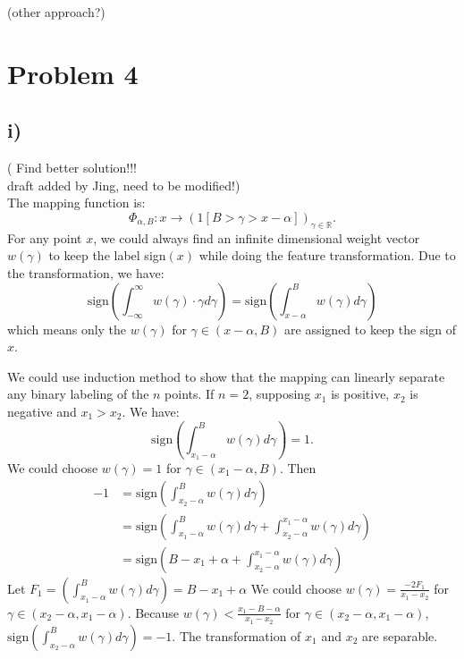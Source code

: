 \documentclass[twoside,11pt]{homework}
\begin{document}
\color{red}(other approach?) \color{black}


\section*{Problem 4}
\subsection*{i)}
\color{red} (
Find better solution!!!\\
draft added by Jing, need to be modified!) \color{black} \\
The mapping function is:
%
\begin{equation}  
\Phi_{\alpha, B}: x \rightarrow (1[B > \gamma > x-\alpha])_{\gamma \in \mathbb{R}}.
\end{equation}
%
For any point $x$, we could always find  an infinite dimensional weight vector $w(\gamma)$ to keep the label sign$(x)$ while doing the feature transformation. 
Due to the transformation, we have:
%
\begin{equation}
\mathrm{sign}(\int_{-\infty}^{\infty} w(\gamma) \cdot \gamma d\gamma ) = \mathrm{sign}(\int_{x - \alpha}^B w(\gamma) d\gamma)
\end{equation}
%
which means only the $w(\gamma) $ for $\gamma \in (x - \alpha, B)$ are assigned to keep the sign of $x$.

We could use induction method to show that the mapping can linearly separate any binary labeling of the $n$ points.
If $n=2$, supposing $x_1$  is positive,  $x_2$ is negative and $x_1 > x_2$.
We have:
%
\begin{equation}
\mathrm{sign}(\int_{x_1 - \alpha}^B w(\gamma) d\gamma) = 1.
\end{equation}
%
We could choose $w(\gamma) = 1$ for $\gamma \in (x_1 - \alpha, B)$.
Then
%
\begin{equation}
\begin{split}
-1 &= \mathrm{sign}(\int_{x_2 - \alpha}^B w(\gamma) d\gamma)  \\
    &= \mathrm{sign}(\int_{x_1 - \alpha}^B w(\gamma) d\gamma + \int_{x_2 - \alpha}^{x_1 - \alpha} w(\gamma) d\gamma) \\
    &= \mathrm{sign}(B - x_1 + \alpha + \int_{x_2 - \alpha}^{x_1 - \alpha} w(\gamma) d\gamma)
\end{split}
\end{equation}
%
Let $F_1 =(\int_{x_1 - \alpha}^B w(\gamma) d\gamma) = B - x_1 + \alpha $
We could choose $w(\gamma)  = \frac{-2F_1}{x_1 - x_2}$ for $\gamma \in (x_2 - \alpha, x_1 - \alpha)$.
Because  $w(\gamma) < \frac{x_1 - B- \alpha}{x_1 - x_2}$ for $\gamma \in (x_2 - \alpha, x_1 - \alpha)$, $\mathrm{sign}(\int_{x_2 - \alpha}^B w(\gamma) d\gamma) = -1$.
The transformation of $x_1$ and $x_2$ are separable.
\end{document}
